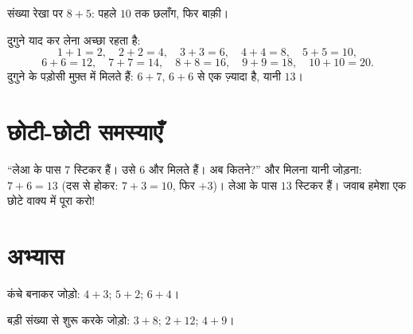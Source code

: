 \begin{omfigure}

{\small संख्या रेखा पर $8 + 5$: पहले $10$ तक छलाँग, फिर बाक़ी।}
\end{omfigure}

\begin{example}[दुगुने]\label{ex:g1:addition:doubles}
दुगुने याद कर लेना अच्छा रहता है:
\[
1+1=2, \quad 2+2=4, \quad 3+3=6, \quad 4+4=8, \quad 5+5=10,
\]
\[
6+6=12, \quad 7+7=14, \quad 8+8=16, \quad 9+9=18, \quad 10+10=20 .
\]
दुगुने के पड़ोसी मुफ़्त में मिलते हैं: $6 + 7$, $6 + 6$ से एक ज़्यादा है, यानी $13$।
\end{example}

\section{छोटी-छोटी समस्याएँ}

\begin{example}\label{ex:g1:addition:problem}
``लेआ के पास $7$ स्टिकर हैं। उसे $6$ और मिलते हैं। अब कितने?''
और मिलना यानी जोड़ना: $7 + 6 = 13$ (दस से होकर:
$7 + 3 = 10$, फिर $+3$)। लेआ के पास $13$ स्टिकर हैं। जवाब हमेशा
एक छोटे वाक्य में पूरा करो!
\end{example}

\section{अभ्यास}

\begin{exercise}[$\star$]\label{exo:g1:addition:1}
कंचे बनाकर जोड़ो: $4 + 3$; \quad $5 + 2$; \quad
$6 + 4$।
\end{exercise}

\begin{exercise}[$\star$]\label{exo:g1:addition:2}
बड़ी संख्या से शुरू करके जोड़ो: $3 + 8$; \quad
$2 + 12$; \quad $4 + 9$।
\end{exercise}

